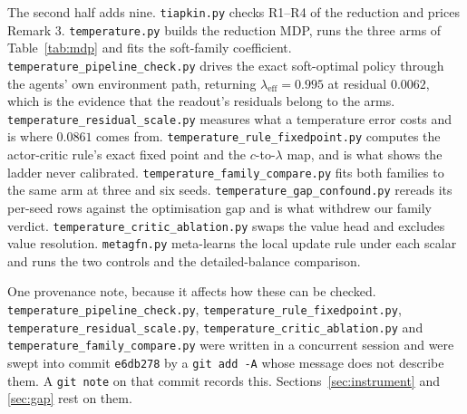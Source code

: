 \documentclass[11pt]{article}
\theoremstyle{remark}
\newcommand{\us}{\_\allowbreak}
\begin{document}
The second half adds nine. \texttt{tiapkin.py} checks R1--R4 of the reduction
and prices Remark 3. \texttt{temperature.py} builds the reduction MDP, runs the
three arms of Table~\ref{tab:mdp} and fits the soft-family coefficient.
\texttt{temperature\_pipeline\_check.py} drives the exact soft-optimal policy
through the agents' own environment path, returning $\lambda_{\mathrm{eff}} =
0.995$ at residual $0.0062$, which is the evidence that the readout's residuals
belong to the arms. \texttt{temperature\_residual\_scale.py} measures what a
temperature error costs and is where $0.0861$ comes from.
\texttt{temperature\_rule\_fixedpoint.py} computes the actor-critic rule's exact
fixed point and the $c$-to-$\lambda$ map, and is what shows the ladder never
calibrated. \texttt{temperature\_family\_compare.py} fits both families to the
same arm at three and six seeds. \texttt{temperature\_gap\_confound.py} rereads
its per-seed rows against the optimisation gap and is what withdrew our family
verdict. \texttt{temperature\_critic\_ablation.py} swaps the value head and
excludes value resolution. \texttt{metagfn.py} meta-learns the local update rule
under each scalar and runs the two controls and the detailed-balance comparison.

\begin{sloppypar}
One provenance note, because it affects how these can be checked.
\texttt{temperature\us pipeline\us check.py},
\texttt{temperature\us rule\us fixedpoint.py},
\texttt{temperature\us residual\us scale.py},
\texttt{temperature\us critic\us ablation.py} and
\texttt{temperature\us family\us compare.py} were written in a concurrent session
and were swept into commit \texttt{e6db278} by a \texttt{git add -A} whose message
does not describe them. A \texttt{git note} on that commit records this.
Sections~\ref{sec:instrument} and \ref{sec:gap} rest on them.
\end{sloppypar}
\end{document}
